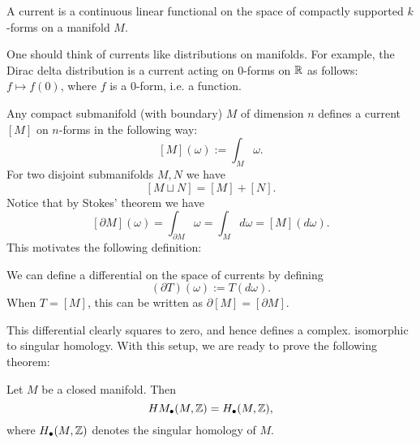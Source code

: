 \begin{definition}[Current]
    A current is a continuous linear functional on the space of compactly supported $k$-forms on a manifold $M$.
\end{definition}
\begin{remark}
    One should think of currents like distributions on manifolds. For example, the Dirac delta distribution is a current acting on $0$-forms on $\R$ as follows: $f \mapsto  f(0)$, where $f$ is a $0$-form, i.e. a function.
\end{remark}
\begin{eg}
    Any compact submanifold (with boundary) $M$ of dimension $n$ defines a current $[M]$ on $n$-forms in the following way:
    \[
        [M](\omega) := \int_M \omega
    .\] 
    For two disjoint submanifolds $M, N$ we have
    \[
        [M \sqcup N] = [M] + [N]
    .\] 
    Notice that by Stokes' theorem we have
    \[
        [\partial M](\omega) = \int_{\partial M} \omega = \int_M d \omega = [M](d \omega).
    \] 
    This motivates the following definition:
\end{eg}
\begin{definition}
    We can define a differential on the space of currents by defining
    \[
        (\partial T) (\omega) := T(d \omega)
    .\] 
    When $T = [M]$, this can be written as $\partial [M] = [\partial M]$. 
\end{definition}
This differential clearly squares to zero, and hence defines a complex.
 isomorphic to singular homology.
With this setup, we are ready to prove the following theorem:

\begin{theorem}
    Let $M$ be a closed manifold. Then
     \[
         \HMf[\bul]{M, \Z} = H_{\bul}(M, \Z)
    ,\] 
    where $H_{\bul}(M, \Z)$ denotes the singular homology of $M$.
\end{theorem}

